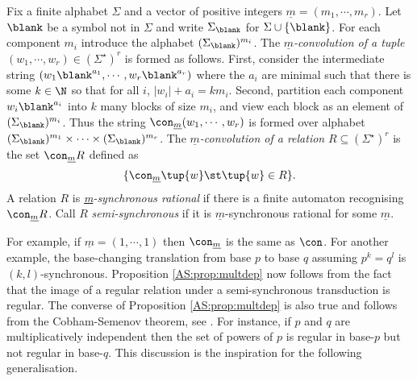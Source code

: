 \begin{definition}
Fix a finite alphabet $\Sigma$ and a vector of positive integers $\underline{m} = (m_1,\cdots,m_r)$.  
Let $\blank$ be a symbol not in $\Sigma$ and write $\Sigma_{\blank}$ for $\Sigma \cup \{\blank\}$.
For each component $m_i$ introduce the alphabet 
$(\Sigma_{\blank})^{m_i}$.  The {\em $\underline{m}$-convolution of a tuple} 
$(w_1,\cdots,w_r) \in (\Sigma^{\star})^r$ is formed as follows. First, consider the intermediate
string $(w_1\blank^{a_1}, \cdots, w_r\blank^{a_r})$ where the $a_i$ are minimal
such that there is some $k \in \N$ so that for all $i$, $|w_i|+a_i = km_i$. Second,
partition each component $w_i\blank^{a_i}$ into $k$ many blocks of size $m_i$,
and view each block as an element of $(\Sigma_{\blank})^{m_i}$. Thus the string
$\con_{\underline{m}} (w_1,\cdots,w_r)$ is formed over alphabet
$(\Sigma_{\blank})^{m_1} \times \cdots \times (\Sigma_{\blank})^{m_r}$.
The {\em $\underline{m}$-convolution of a relation} $R \subseteq (\Sigma^{\star})^r$ is the
set $\con_{\underline{m}} R$ defined as 
\[
\{\con_{\underline{m}} \tup{w} \st \tup{w} \in R\}.
\]
A relation $R$ is {\em \underline{m}-synchronous rational} if there is a finite automaton
recognising $\con_{\underline{m}} R$.
Call $R$ {\em semi-synchronous} if it is $\underline{m}$-synchronous rational for some $\underline{m}$.
\end{definition}

For example, if $\underline{m} = (1,\cdots, 1)$ then $\con_{\underline{m}}$ is the same as $\con$.
For another example, the base-changing translation from base $p$ to base $q$ assuming $p^k = q^l$ is $(k,l)$-synchronous. Proposition \ref{AS:prop:multdep} now follows
from the fact that the image of a regular relation under a semi-synchronous transduction is regular. The converse of Proposition \ref{AS:prop:multdep} is also true and follows from the Cobham-Semenov theorem, see \cite{BHMCV94}. For instance, if $p$ and $q$ are multiplicatively independent then the set of powers of $p$ is regular in base-$p$ but not
regular in base-$q$. This discussion is the inspiration for the following generalisation.





